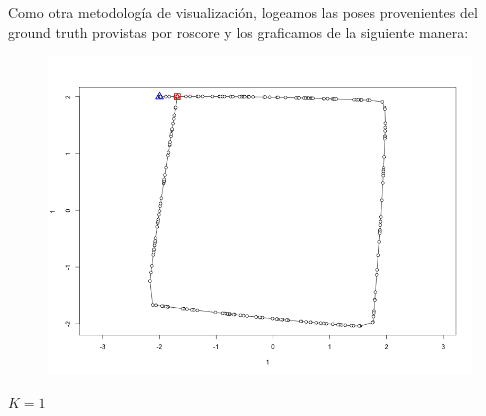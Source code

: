 Como otra metodología de visualización, logeamos las poses provenientes del ground truth provistas por roscore y los graficamos de la siguiente manera:

\begin{figure}[!htb]
\begin{center}
\includegraphics[width=\linewidth/2]{imagenesTrayectorias/lazocerrado/lazocerrado04.png}
\end{center}
\end{figure}
\FloatBarrier

$K = 1$

